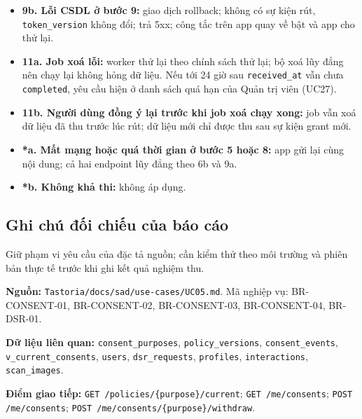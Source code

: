 \begin{itemize}
\item \textbf{9b. Lỗi CSDL ở bước 9:} giao dịch rollback; không có sự kiện rút, {\small\texttt{token\_\allowbreak{}\allowbreak{}version}} không đổi; trả 5xx; công tắc trên app quay về bật và app cho thử lại.
\item \textbf{11a. Job xoá lỗi:} worker thử lại theo chính sách thử lại; bộ xoá lũy đẳng nên chạy lại không hỏng dữ liệu. Nếu tới 24 giờ sau {\small\texttt{received\_\allowbreak{}\allowbreak{}at}} vẫn chưa {\small\texttt{completed}}, yêu cầu hiện ở danh sách quá hạn của Quản trị viên (UC27).
\item \textbf{11b. Người dùng đồng ý lại trước khi job xoá chạy xong:} job vẫn xoá dữ liệu đã thu trước lúc rút; dữ liệu mới chỉ được thu sau sự kiện grant mới.
\item \textbf{*a. Mất mạng hoặc quá thời gian ở bước 5 hoặc 8:} app gửi lại cùng nội dung; cả hai endpoint lũy đẳng theo 6b và 9a.
\item \textbf{*b. Không khả thi:} không áp dụng.
\end{itemize}
\subsection{Ghi chú đối chiếu của báo cáo}
Giữ phạm vi yêu cầu của đặc tả nguồn; cần kiểm thử theo môi trường và phiên bản thực tế trước khi ghi kết quả nghiệm thu.

\textbf{Nguồn:} {\small\texttt{Tastoria/\allowbreak{}\allowbreak{}docs/\allowbreak{}\allowbreak{}sad/\allowbreak{}\allowbreak{}use-\allowbreak{}cases/\allowbreak{}\allowbreak{}UC05.\allowbreak{}md}}. Mã nghiệp vụ: BR-\allowbreak{}CONSENT-\allowbreak{}01, BR-\allowbreak{}CONSENT-\allowbreak{}02, BR-\allowbreak{}CONSENT-\allowbreak{}03, BR-\allowbreak{}CONSENT-\allowbreak{}04, BR-\allowbreak{}DSR-\allowbreak{}01.

\textbf{Dữ liệu liên quan:} {\small\texttt{consent\_\allowbreak{}\allowbreak{}purposes}}, {\small\texttt{policy\_\allowbreak{}\allowbreak{}versions}}, {\small\texttt{consent\_\allowbreak{}\allowbreak{}events}}, {\small\texttt{v\_\allowbreak{}\allowbreak{}current\_\allowbreak{}\allowbreak{}consents}}, {\small\texttt{users}}, {\small\texttt{dsr\_\allowbreak{}\allowbreak{}requests}}, {\small\texttt{profiles}}, {\small\texttt{interactions}}, {\small\texttt{scan\_\allowbreak{}\allowbreak{}images}}.

\textbf{Điểm giao tiếp:} {\small\texttt{GET /\allowbreak{}\allowbreak{}policies/\allowbreak{}\allowbreak{}\{purpose\}/\allowbreak{}\allowbreak{}current}}; {\small\texttt{GET /\allowbreak{}\allowbreak{}me/\allowbreak{}\allowbreak{}consents}}; {\small\texttt{POST /\allowbreak{}\allowbreak{}me/\allowbreak{}\allowbreak{}consents}}; {\small\texttt{POST /\allowbreak{}\allowbreak{}me/\allowbreak{}\allowbreak{}consents/\allowbreak{}\allowbreak{}\{purpose\}/\allowbreak{}\allowbreak{}withdraw}}.

